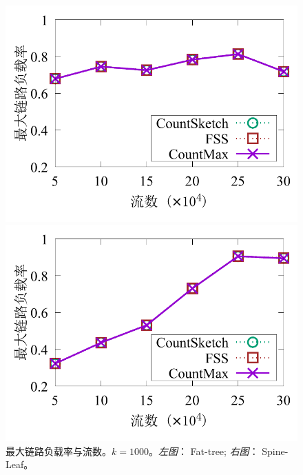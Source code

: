 \begin{figure}[ht]
	\centering
	\begin{minipage}[t]{0.49\linewidth}
		\centering
		\includegraphics[width=\linewidth]{fig/ft_flow_load_1000.pdf}
	\end{minipage}\vspace{-0.6em}%
	\begin{minipage}[t]{0.49\linewidth}
		\centering
		\includegraphics[width=\linewidth]{fig/hy_flow_load_1000.pdf}
	\end{minipage} \vspace{-0.6em}%
	\caption{\textnormal{最大链路负载率与流数。$k=1000$。\textit{左图}： Fat-tree; \textit{右图}： Spine-Leaf。}}
	\label{fig:load,f}
\end{figure}


